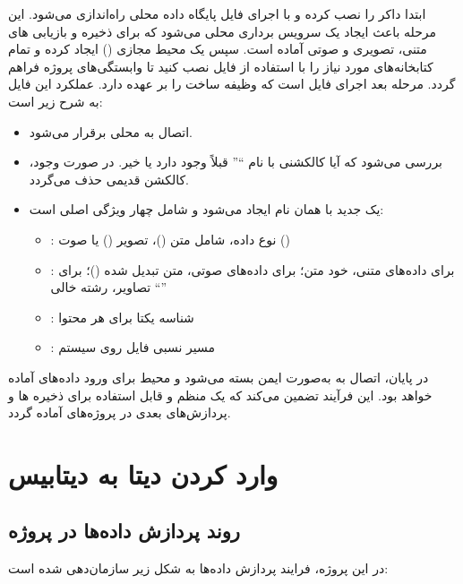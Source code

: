 \documentclass{article}
\begin{document}
ابتدا داکر را نصب کرده و با اجرای فایل  پایگاه داده  محلی راه‌اندازی می‌شود.
این مرحله باعث ایجاد یک سرویس برداری محلی می‌شود که برای ذخیره و بازیابی های متنی، تصویری و صوتی آماده است.
سپس یک محیط مجازی () ایجاد کرده و تمام کتابخانه‌های مورد نیاز را با استفاده از فایل  نصب کنید تا وابستگی‌های پروژه فراهم گردد.
مرحله بعد اجرای فایل  است که وظیفه ساخت  را بر عهده دارد.
عملکرد این فایل به شرح زیر است:
\begin{itemize}
\item اتصال به  محلی برقرار می‌شود.

\item بررسی می‌شود که آیا کالکشنی با نام ``'' قبلاً وجود دارد یا خیر.
در صورت وجود، کالکشن قدیمی حذف می‌گردد.
\item یک  جدید با همان نام ایجاد می‌شود و شامل چهار ویژگی اصلی است:
\begin{itemize}
\item {}: نوع داده، شامل متن ()، تصویر () یا صوت ()
\item {}: برای داده‌های متنی، خود متن؛
برای داده‌های صوتی، متن تبدیل شده ()؛ برای تصاویر، رشته خالی ``''
\item {}: شناسه یکتا برای هر محتوا
\item {}: مسیر نسبی فایل روی سیستم
\end{itemize}
\end{itemize}

در پایان، اتصال به  به‌صورت ایمن بسته می‌شود و محیط برای ورود داده‌های  آماده خواهد بود.
این فرآیند تضمین می‌کند که یک  منظم و قابل استفاده برای ذخیره ها و پردازش‌های بعدی در پروژه‌های  آماده گردد.


\section{وارد کردن دیتا به دیتابیس}

\subsection{روند پردازش داده‌ها در پروژه}
در این پروژه، فرایند پردازش داده‌ها به شکل زیر سازمان‌دهی شده است:
\end{document}

